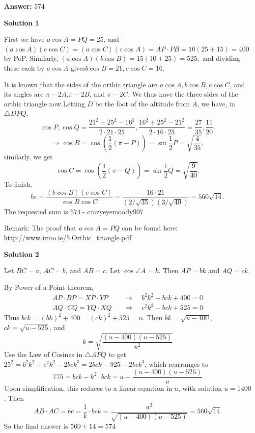 \begin{enumerate}
 
 \textbf{Answer: }574



\textbf{Solution 1}

First we have $a\cos A=PQ=25$, and $(a\cos A)(c\cos C)=(a\cos C)(c\cos A)=AP\cdot PB=10(25+15)=400$ by PoP. Similarly, $(a\cos A)(b\cos B)=15(10+25)=525,$ and dividing these each by $a\cos A$ gives$b\cos B=21,c\cos C=16$. 

 It is known that the sides of the orthic triangle are $a\cos A,b\cos B,c\cos C$, and its angles are $\pi-2A$,$\pi-2B$, and $\pi-2C$. We thus have the three sides of the orthic triangle now.Letting $D$ be the foot of the altitude from $A$, we have, in $\triangle DPQ$, 
 \[\cos P,\cos Q=\frac{21^2+25^2-16^2}{2\cdot 21\cdot 25},\frac{16^2+25^2-21^2}{2\cdot 16\cdot 25}= \frac{27}{35}, \frac{11}{20}.\]
 \[\Rightarrow \cos B=\cos\left(\frac 12 (\pi-P)\right)=\sin\frac 12 P =\sqrt{\frac{4}{35}},\]similarly, we get  
 \[\cos C=\cos\left(\frac 12 (\pi-Q)\right)=\sin\frac 12 Q=\sqrt{\frac{9}{40}}.\]To finish, 
 \[bc= \frac{(b\cos B)(c\cos C)}{\cos B\cos C}=\frac{16\cdot 21}{(2/\sqrt{35})(3/\sqrt{40})}=560\sqrt{14}.\]The requested sum is $\boxed{574}$.- crazyeyemoody907

 Remark: The proof that $a \cos A = PQ$ can be found here: \href{https://artofproblemsolving.comhttp://www.irmo.ie/5.Orthic\_triangle.pdf}{http://www.irmo.ie/5.Orthic\_triangle.pdf}

 



\textbf{Solution 2}

Let $BC=a$, $AC=b$, and $AB=c$. Let $\cos\angle A=k$. Then $AP=bk$ and $AQ=ck$. 

 By Power of a Point theorem, 
 \begin{align}     AP\cdot BP=XP\cdot YP \quad &\Longrightarrow \quad b^2k^2-bck+400=0\\     AQ\cdot CQ=YQ\cdot XQ \quad &\Longrightarrow \quad c^2k^2-bck+525=0 \end{align}Thus $bck = (bk)^2+400=(ck)^2+525 = u$. Then $bk=\sqrt{u-400}$, $ck=\sqrt{u-525}$, and 
 \[k=\sqrt{\frac{(u-400)(u-525)}{u^2}}\]Use the Law of Cosines in $\triangle APQ$ to get $25^2=b^2k^2+c^2k^2-2bck^3 = 2bck-925-2bck^3$, which rearranges to 
 \[775=bck - k^2\cdot bck  = u-\frac{(u-400)(u-525)}{u}\]Upon simplification, this reduces to a linear equation in $u$, with solution $u=1400$. Then 
 \[AB\cdot AC = bc = \frac 1{k}\cdot bck = \frac{u^2}{\sqrt{(u-400)(u-525)}}=560 \sqrt{14}\]So the final answer is $560 + 14 = \boxed{574}$


\end{enumerate}
